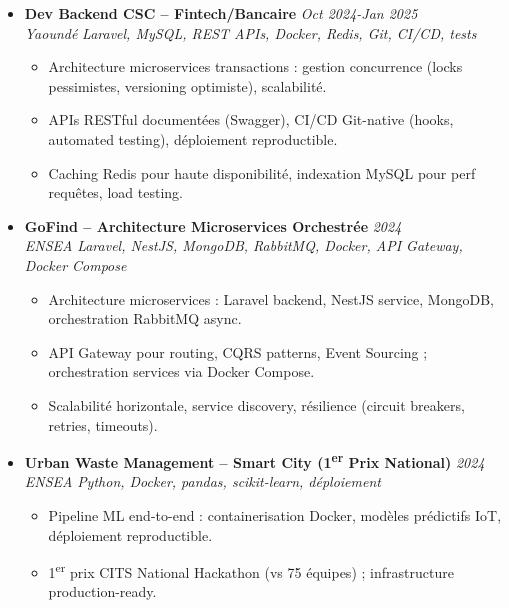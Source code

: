 \documentclass[a4paper,11pt]{article}
\begin{document}
\begin{itemize}[leftmargin=*, label=\tiny$\bullet$, nosep]
    \item \textbf{Dev Backend CSC -- Fintech/Bancaire} \hfill \textit{Oct 2024-Jan 2025} \\
    \textit{Yaound\'e} \hfill \textit{Laravel, MySQL, REST APIs, Docker, Redis, Git, CI/CD, tests}
    \vspace{-2pt}
    \begin{itemize}[leftmargin=0.4cm, nosep, label=\tiny$\bullet$]
        \item \small{Architecture microservices transactions : gestion concurrence (locks pessimistes, versioning optimiste), scalabilit\'e.}
        \item \small{APIs RESTful document\'ees (Swagger), CI/CD Git-native (hooks, automated testing), d\'eploiement reproductible.}
        \item \small{Caching Redis pour haute disponibilit\'e, indexation MySQL pour perf requ\^etes, load testing.}
    \end{itemize}
    \vspace{3pt}

    \item \textbf{GoFind -- Architecture Microservices Orchestr\'ee} \hfill \textit{2024} \\
    \textit{ENSEA} \hfill \textit{Laravel, NestJS, MongoDB, RabbitMQ, Docker, API Gateway, Docker Compose}
    \vspace{-2pt}
    \begin{itemize}[leftmargin=0.4cm, nosep, label=\tiny$\bullet$]
        \item \small{Architecture microservices : Laravel backend, NestJS service, MongoDB, orchestration RabbitMQ async.}
        \item \small{API Gateway pour routing, CQRS patterns, Event Sourcing ; orchestration services via Docker Compose.}
        \item \small{Scalabilit\'e horizontale, service discovery, r\'esilience (circuit breakers, retries, timeouts).}
    \end{itemize}
    \vspace{3pt}

    \item \textbf{Urban Waste Management -- Smart City (1\textsuperscript{er} Prix National)} \hfill \textit{2024} \\
    \textit{ENSEA} \hfill \textit{Python, Docker, pandas, scikit-learn, d\'eploiement}
    \vspace{-2pt}
    \begin{itemize}[leftmargin=0.4cm, nosep, label=\tiny$\bullet$]
        \item \small{Pipeline ML end-to-end : containerisation Docker, mod\`eles pr\'edictifs IoT, d\'eploiement reproductible.}
        \item \small{1\textsuperscript{er} prix CITS National Hackathon (vs 75 \'equipes) ; infrastructure production-ready.}
    \end{itemize}
    \vspace{3pt}


\end{itemize}
\end{document}
